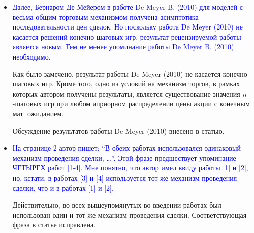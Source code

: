 \documentclass[12pt]{extarticle}
\begin{document}
\begin{itemize}
\item%
  \textcolor{blue}{%
    Далее, Бернаром Де Мейером в работе De Meyer B. (2010) для моделей с весьма
    общим торговым механизмом получена асимптотика последовательности цен
    сделок. Но поскольку работа De Meyer (2010) не касается решений
    конечно-шаговых игр, результат рецензируемой работы является новым. Тем не
    менее упоминание работы De Meyer B. (2010) необходимо.}

  Как было замечено, результат работы De Meyer (2010) не касается
  конечно-шаговых игр. Кроме того, одно из условий на механизм торгов, в рамках
  которых автором получены результаты, является существование значения
  $n$-шаговых игр при любом априорном распределении цены акции с конечным мат.
  ожиданием.

  Обсуждение результатов работы De Meyer (2010) внесено в статью.
  
\item%
  \textcolor{blue}{%
    На странице 2 автор пишет: ``В обеих работах использовался одинаковый
    механизм проведения сделки, \dots''. Этой фразе предшествует упоминание
    ЧЕТЫРЕХ работ [1-4]. Мне понятно, что автор имел ввиду работы [1] и [2], но,
    кстати, в работах [3] и [4] используется тот же механизм проведения сделки,
    что и в работах [1] и [2].}

  Действительно, во всех вышеупомянутых во введении работах был использован один
  и тот же механизм проведения сделки. Соответствующая фраза в статье
  исправлена.
\end{itemize}
\end{document}
